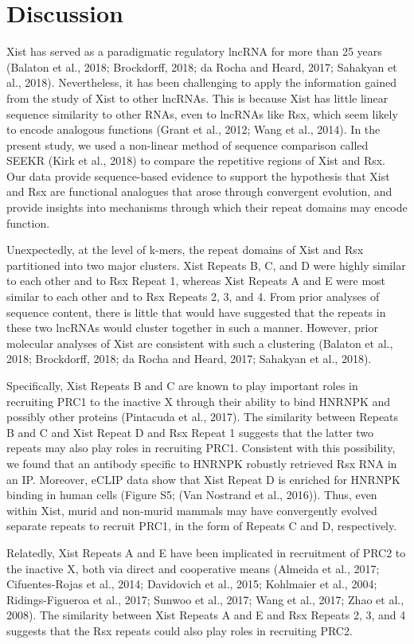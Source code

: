 \section{Discussion}
Xist has served as a paradigmatic regulatory lncRNA for more than 25 years (Balaton et al., 2018; Brockdorff, 2018; da Rocha and Heard, 2017; Sahakyan et al., 2018). Nevertheless, it has been challenging to apply the information gained from the study of Xist to other lncRNAs. This is because Xist has little linear sequence similarity to other RNAs, even to lncRNAs like Rsx, which seem likely to encode analogous functions (Grant et al., 2012; Wang et al., 2014). In the present study, we used a non-linear method of sequence comparison called SEEKR (Kirk et al., 2018) to compare the repetitive regions of Xist and Rsx. Our data provide sequence-based evidence to support the hypothesis that Xist and Rsx are functional analogues that arose through convergent evolution, and provide insights into mechanisms through which their repeat domains may encode function. 

Unexpectedly, at the level of k-mers, the repeat domains of Xist and Rsx partitioned into two major clusters. Xist Repeats B, C, and D were highly similar to each other and to Rsx Repeat 1, whereas Xist Repeats A and E were most similar to each other and to Rsx Repeats 2, 3, and 4. From prior analyses of sequence content, there is little that would have suggested that the repeats in these two lncRNAs would cluster together in such a manner. However, prior molecular analyses of Xist are consistent with such a clustering (Balaton et al., 2018; Brockdorff, 2018; da Rocha and Heard, 2017; Sahakyan et al., 2018). 

Specifically, Xist Repeats B and C are known to play important roles in recruiting PRC1 to the inactive X through their ability to bind HNRNPK and possibly other proteins (Pintacuda et al., 2017). The similarity between Repeats B and C and Xist Repeat D and Rsx Repeat 1 suggests that the latter two repeats may also play roles in recruiting PRC1. Consistent with this possibility, we found that an antibody specific to HNRNPK robustly retrieved Rsx RNA in an IP. Moreover, eCLIP data show that Xist Repeat D is enriched for HNRNPK binding in human cells (Figure S5; (Van Nostrand et al., 2016)). Thus, even within Xist, murid and non-murid mammals may have convergently evolved separate repeats to recruit PRC1, in the form of Repeats C and D, respectively.

Relatedly, Xist Repeats A and E have been implicated in recruitment of PRC2 to the inactive X, both via direct and cooperative means (Almeida et al., 2017; Cifuentes-Rojas et al., 2014; Davidovich et al., 2015; Kohlmaier et al., 2004; Ridings-Figueroa et al., 2017; Sunwoo et al., 2017; Wang et al., 2017; Zhao et al., 2008). The similarity between Xist Repeats A and E and Rsx Repeats 2, 3, and 4 suggests that the Rsx repeats could also play roles in recruiting PRC2. 

